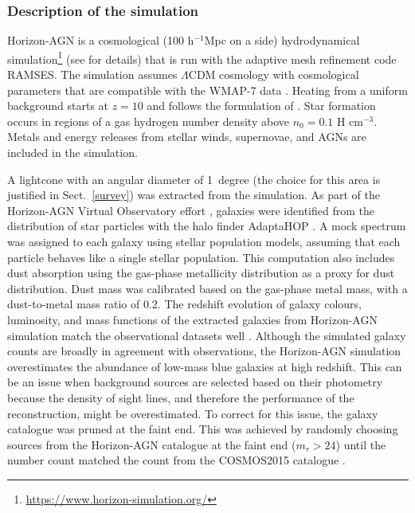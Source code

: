 \documentclass{aa}
\begin{document}
\subsubsection{Description of the simulation}
{\sc Horizon-AGN} is a cosmological (100 h$^{-1}$Mpc on a side) hydrodynamical simulation\footnote{\url{https://www.horizon-simulation.org/}} (see \citealt{Dubois2014} for details) that is run with the adaptive mesh refinement code RAMSES. The simulation assumes $\Lambda$CDM cosmology with cosmological parameters that are compatible with the WMAP-7 data \citep{Komatsu2011}. Heating from a uniform background starts at $z = 10$ and follows the formulation of \citet{Haardt1996}. Star formation occurs in regions of a gas hydrogen number density above $n_{0}= 0.1$ H cm$^{-3}$. Metals and energy releases from stellar winds, supernovae, and AGNs are included in the simulation.

A lightcone with an angular diameter of 1~degree (the choice for this area is justified in Sect.~\ref{survey}) was extracted from the simulation. As part of the {\sc Horizon-AGN} Virtual Observatory effort \citep[see][for details]{laigle19}, galaxies were identified from the distribution of star particles   with the halo finder {\sc AdaptaHOP}  \citep{aubert04}. A mock spectrum was assigned to each galaxy using \citet[][]{bruzual&charlot03} stellar population models, assuming that each particle behaves like a single stellar population. This computation also includes dust absorption using the gas-phase metallicity distribution as a proxy for dust distribution. Dust mass was calibrated based on the gas-phase metal mass, with a dust-to-metal mass ratio of 0.2. The redshift evolution of galaxy colours, luminosity, and mass functions of the extracted galaxies from Horizon-AGN simulation match the observational datasets well \citep[e.g.][]{Kaviraj2017}. Although the simulated galaxy counts are broadly in agreement with observations, the {\sc Horizon-AGN} simulation overestimates the abundance of low-mass blue galaxies at high redshift. This can be an issue when background sources are selected based on their photometry because the density of sight lines, and therefore the performance of the reconstruction, might be overestimated. To correct for this issue, the galaxy catalogue was pruned at the faint end. This was achieved by randomly choosing sources from the {\sc Horizon-AGN} catalogue at the faint end ($m_{r}>24$) until the number count matched the count from the COSMOS2015 catalogue \citep{Laigle2016}.
\end{document}
